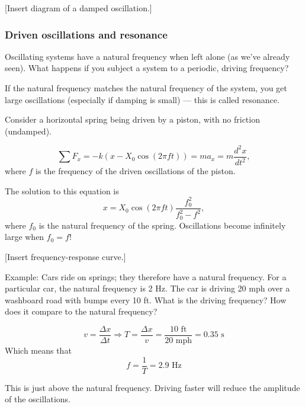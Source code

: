 [Insert diagram of a damped oscillation.]
\vspace{5cm}

\subsubsection{Driven oscillations and resonance}
Oscillating systems have a natural frequency when left alone (as we've already seen). What happens if you subject a system to a periodic, driving frequency?

If the natural frequency matches the natural frequency of the system, you get large oscillations (especially if damping is small) --- this is called resonance.

Consider a horizontal spring being driven by a piston, with no friction (undamped).

$$\sum F_x = -k(x-X_0\cos(2\pi ft)) = ma_x = m\frac{d^2x}{dt^2},$$
where $f$ is the frequency of the driven oscillations of the piston.

The solution to this equation is
$$x = X_0\cos(2\pi ft)\frac{f_0^2}{f_0^2-f^2},$$
where $f_0$ is the natural frequency of the spring. Oscillations become infinitely large when $f_0=f$!

[Insert frequency-response curve.]
\vspace{5cm}

Example: Cars ride on springs; they therefore have a natural frequency. For a particular car, the natural frequency is 2 Hz. The car is driving 20 mph over a washboard road with bumps every 10 ft. What is the driving frequency? How does it compare to the natural frequency?

$$v=\frac{\Delta{x}}{\Delta{t}}\Rightarrow T=\frac{\Delta{x}}{v}=\frac{10\mbox{ ft}}{20\mbox{ mph}}=0.35\mbox{ s}$$
Which means that
$$f=\frac{1}{T}=2.9\mbox{ Hz}$$

This is just above the natural frequency. Driving faster will reduce the amplitude of the oscillations.


\clearpage
